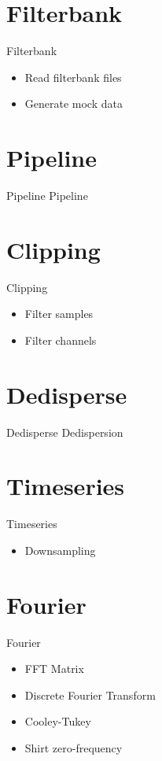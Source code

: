 \documentclass{beamer}
\begin{document}
\section{Filterbank}
\begin{frame}{Filterbank}
	\begin{itemize}
		\item Read filterbank files
		\item Generate mock data
	\end{itemize}
\end{frame}

\section{Pipeline}
\begin{frame}{Pipeline}
	Pipeline
\end{frame}

\section{Clipping}
\begin{frame}{Clipping}
	\begin{itemize}
		\item Filter samples
		\item Filter channels
	\end{itemize}
\end{frame}

\section{Dedisperse}
\begin{frame}{Dedisperse}
	Dedispersion
\end{frame}

\section{Timeseries}
\begin{frame}{Timeseries}
	\begin{itemize}
		\item Downsampling
	\end{itemize}
\end{frame}

\section{Fourier}
\begin{frame}{Fourier}
	\begin{itemize}
		\item FFT Matrix
		\item Discrete Fourier Transform
		\item Cooley-Tukey
		\item Shirt zero-frequency
	\end{itemize}
\end{frame}
\end{document}
